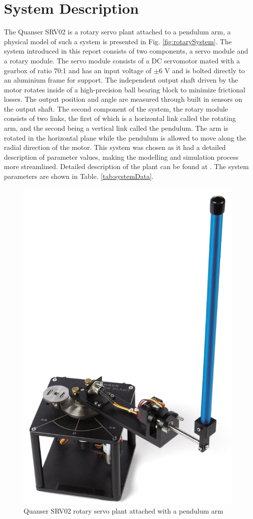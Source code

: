 \documentclass[superscriptaddress,floatfix,reprint,amssymb, amsmath,aps, pre]{revtex4-1}
\begin{document}
{    \section{System Description}{
        The Quanser SRV02 is a rotary servo plant attached to a pendulum arm, a physical model of such a system is presented in Fig. \ref{fig:rotarySystem}. The system introduced in this report consists of two components, a servo module and a rotary module.  The servo module consists of a DC servomotor mated with a gearbox of ratio 70:1 and has an input voltage of \(\pm 6\) V and is bolted directly to an aluminium frame for support. The independent output shaft driven by the motor rotates inside of a high-precision ball bearing block to minimize frictional losses. The output position and angle are measured through built in sensors on the output shaft. The second component of the system, the rotary module consists of two links, the first of which is a horizontal link called the rotating arm, and the second being a vertical link called the pendulum. The arm is rotated in the horizontal plane while the pendulum is allowed to move along the radial direction of the motor. This system was chosen as it had a detailed description of parameter values, making the modelling and simulation process more streamlined. Detailed description of the plant can be found at \cite{apkarian_user_2011}. The system parameters are shown in Table. \ref{tab:systemData}.
        \begin{figure}[h!]
            \includegraphics[width = 0.5\linewidth]{systemPic.png}
            \caption{Quanser SRV02 rotary servo plant attached with a pendulum arm}

\end{figure}}}
\end{document}
